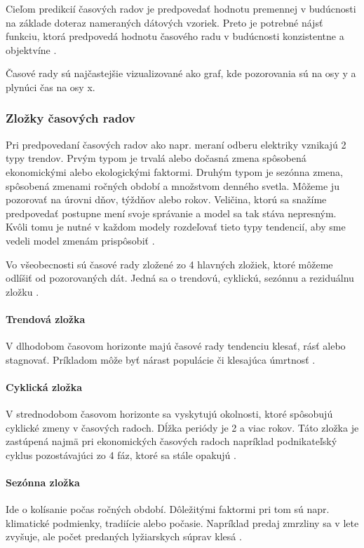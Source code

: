 \documentclass[a4paper,slovak,12pt,appendix]{article}
\begin{document}
Cieľom predikcií časových radov je predpovedať hodnotu premennej v budúcnosti
na základe doteraz nameraných dátových vzoriek. Preto je potrebné nájsť funkciu,
ktorá predpovedá hodnotu časového radu v budúcnosti konzistentne
a objektvíne \cite{Sapankevych2009}.

Časové rady sú najčastejšie vizualizované ako graf, kde pozorovania sú na
osy y a plynúci čas na osy x.

\subsubsection{Zložky časových radov}
Pri predpovedaní časových radov ako napr. meraní odberu elektriky vznikajú
2 typy trendov. Prvým typom je trvalá alebo dočasná zmena spôsobená
ekonomickými alebo ekologickými faktormi. Druhým typom je sezónna zmena,
spôsobená zmenami ročných období a množstvom denného svetla. Môžeme ju pozorovať
na úrovni dňov, týždňov alebo rokov. Veličina, ktorú sa snažíme predpovedať
postupne mení svoje správanie a model sa tak stáva nepresným. Kvôli tomu je
nutné v každom modely rozdeľovať tieto typy tendencií, aby sme vedeli model
zmenám prispôsobiť \cite{Grmanova2016}.

Vo všeobecnosti sú časové rady zložené zo 4 hlavných zložiek, ktoré môžeme
odlíšiť od pozorovaných dát. Jedná sa o trendovú, cyklickú, sezónnu
a reziduálnu zložku \cite{Agrawal2013}.

\paragraph{Trendová zložka}
V dlhodobom časovom horizonte majú časové rady tendenciu klesať, rásť alebo
stagnovať. Príkladom môže byť nárast populácie či klesajúca
úmrtnosť \cite{Agrawal2013}.

\paragraph{Cyklická zložka}
V strednodobom časovom horizonte sa vyskytujú okolnosti, ktoré spôsobujú
cyklické zmeny v časových radoch. Dĺžka periódy je 2 a viac rokov. Táto zložka
je zastúpená najmä pri ekonomických časových radoch napríklad podnikateľský
cyklus pozostávajúci zo 4 fáz, ktoré sa stále opakujú \cite{Agrawal2013}.

\paragraph{Sezónna zložka}
Ide o kolísanie počas ročných období. Dôležitými faktormi pri tom sú napr.
klimatické podmienky, tradiície alebo počasie. Napríklad predaj zmrzliny sa
v lete zvyšuje, ale počet predaných lyžiarskych súprav klesá \cite{Agrawal2013}.
\end{document}
